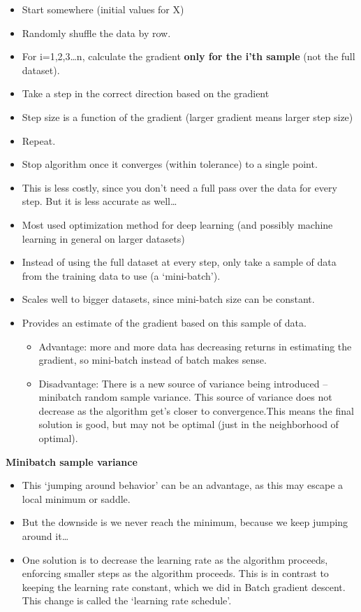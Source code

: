 \documentclass[fontset=fandol,zihao=false,scheme=chinese,heading=true,UTF8]{ctexbook}
\providecommand{\tightlist}{%
  \setlength{\itemsep}{0pt}\setlength{\parskip}{0pt}}
\begin{document}
\begin{itemize}
\item
  Start somewhere (initial values for X)
\item
  Randomly shuffle the data by row.
\item
  For i=1,2,3\ldots{}n, calculate the gradient \textbf{only for the i'th sample} (not the full dataset).
\item
  Take a step in the correct direction based on the gradient
\item
  Step size is a function of the gradient (larger gradient means larger step size)
\item
  Repeat.
\item
  Stop algorithm once it converges (within tolerance) to a single point.
\item
  This is less costly, since you don't need a full pass over the data for every step. But it is less accurate as well\ldots{}
\item
  Most used optimization method for deep learning (and possibly machine learning in general on larger datasets)
\item
  Instead of using the full dataset at every step, only take a sample of data from the training data to use (a `mini-batch').
\item
  Scales well to bigger datasets, since mini-batch size can be constant.
\item
  Provides an estimate of the gradient based on this sample of data.

  \begin{itemize}
  \tightlist
  \item
    Advantage: more and more data has decreasing returns in estimating the gradient, so mini-batch instead of batch makes sense.
  \item
    Disadvantage: There is a new source of variance being introduced -- minibatch random sample variance. This source of variance does not decrease as the algorithm get's closer to convergence.This means the final solution is good, but may not be optimal (just in the neighborhood of optimal).
  \end{itemize}
\end{itemize}

\textbf{Minibatch sample variance}

\begin{itemize}
\tightlist
\item
  This `jumping around behavior' can be an advantage, as this may escape a local minimum or saddle.
\item
  But the downside is we never reach the minimum, because we keep jumping around it\ldots{}
\item
  One solution is to decrease the learning rate as the algorithm proceeds, enforcing smaller steps as the algorithm proceeds. This is in contrast to keeping the learning rate constant, which we did in Batch gradient descent. This change is called the `learning rate schedule'.
\end{itemize}
\end{document}

